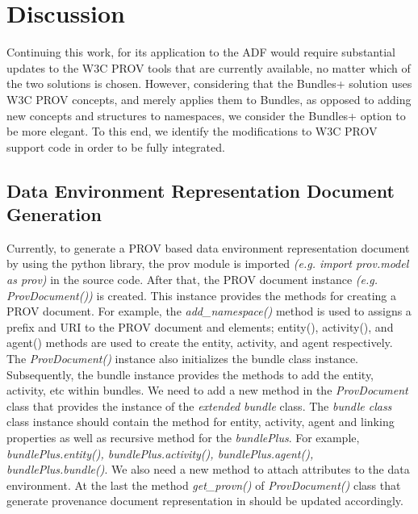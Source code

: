 \section{Discussion} \label{sec:discussion }

Continuing this work, for its application to the ADF would require substantial updates to the W3C PROV tools that are currently available, no matter which of the two solutions is chosen. However, considering that the Bundles+ solution uses W3C PROV concepts, and merely applies them to Bundles, as opposed to adding new concepts and structures to namespaces, we consider the Bundles+ option to be more elegant. To this end, we identify the modifications to W3C PROV support code in order to be fully integrated.

\subsection{Data Environment Representation Document Generation}
Currently, to generate a PROV based data environment representation document by using the python library, the  prov module is imported \textit{(e.g. import prov.model as prov)} in the source code. After that, the PROV document instance \textit{(e.g. ProvDocument())} is created. This instance provides the methods for creating a PROV document. For example, the  \textit{add\_namespace()} method is used to assigns a prefix and URI to the PROV document and elements;  entity(), activity(), and agent() methods are used to create the entity, activity, and agent respectively.  The \textit{ProvDocument()} instance also initializes the bundle class instance. Subsequently, the bundle instance provides the methods to add the entity, activity, etc within bundles. We need to add a new method in the \textit{ProvDocument} class that provides the instance of the \textit{ extended bundle} class. The  \textit{bundle class} class instance should contain the method for entity, activity, agent and linking properties as well as recursive method for the \textit{bundlePlus}. For example, \textit{bundlePlus.entity(), bundlePlus.activity(), bundlePlus.agent(), bundlePlus.bundle()}. We also need a new method to attach attributes to the data environment. At the last the method \textit{get\_provn()}  of \textit{ProvDocument()}  class that generate provenance document representation in  should be updated accordingly. 

